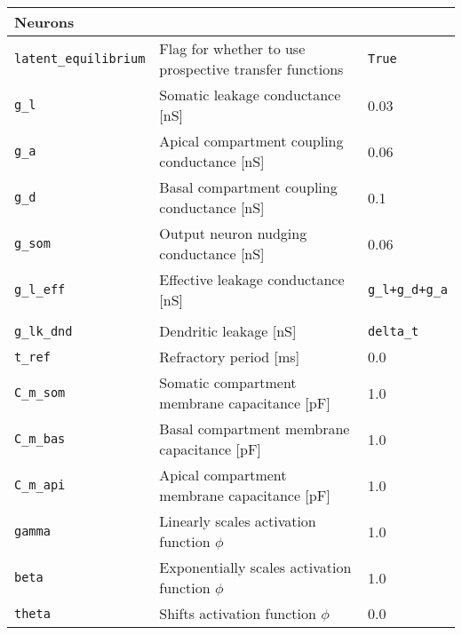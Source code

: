 \begin{table}
\begin{center}
\begin{tabular}{p{}p{}p{}}
      \\
      \textbf{Neurons}
      \\\hline
      \texttt{latent\_equilibrium} & Flag for whether to use prospective transfer functions                      &
      \texttt{True}                                                                                                      \\
      \texttt{g\_l}                & Somatic leakage conductance [nS]                                            & 0.03
      \\
      \texttt{g\_a}                & Apical compartment coupling conductance [nS]                                & 0.06
      \\
      \texttt{g\_d}                & Basal compartment coupling conductance [nS]                                 & 0.1
      \\
      \texttt{g\_som}              & Output neuron nudging conductance [nS]                                      & 0.06
      \\
      \texttt{g\_l\_eff}           & Effective leakage conductance [nS]                                          &
      \texttt{g\_l+g\_d+g\_a}                                                                                            \\
      \\
      \texttt{g\_lk\_dnd}          & Dendritic leakage [nS]                                                      &
      \texttt{delta\_t}                                                                                                  \\
      \texttt{t\_ref}              & Refractory period [ms]                                                      & 0.0   \\
      \texttt{C\_m\_som}           & Somatic compartment membrane capacitance [pF]                               & 1.0
      \\
      \texttt{C\_m\_bas}           & Basal compartment membrane capacitance [pF]                                 & 1.0
      \\
      \texttt{C\_m\_api}           & Apical compartment membrane capacitance [pF]                                & 1.0
      \\
      \texttt{gamma}               & Linearly scales  activation function $\phi$                                 & 1.0
      \\
      \texttt{beta}                & Exponentially scales  activation function $\phi$                            & 1.0
      \\
      \texttt{theta}               & Shifts  activation function $\phi$                                          & 0.0
      \\


\end{tabular}
\end{center}
\end{table}
